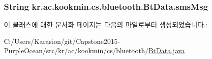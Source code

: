 \subsubsection[{sms\+Msg}]{\setlength{\rightskip}{0pt plus 5cm}String kr.\+ac.\+kookmin.\+cs.\+bluetooth.\+Bt\+Data.\+sms\+Msg\hspace{0.3cm}{\ttfamily [private]}}\label{classkr_1_1ac_1_1kookmin_1_1cs_1_1bluetooth_1_1_bt_data_aeca2f4bab917b5ccae3f7bed813fc2fb}


이 클래스에 대한 문서화 페이지는 다음의 파일로부터 생성되었습니다.\+:\begin{DoxyCompactItemize}
\item 
C\+:/\+Users/\+Karasion/git/\+Capstone2015-\/\+Purple\+Ocean/src/kr/ac/kookmin/cs/bluetooth/\hyperlink{_bt_data_8java}{Bt\+Data.\+java}\end{DoxyCompactItemize}
